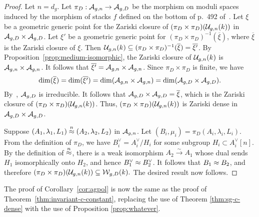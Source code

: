 \documentclass{amsart}
\begin{document}
\begin{proof}
Let $n = d_g$.
Let $\pi_D: \mathcal{A}_{g,n} \to \mathcal{A}_{g,{D}}$ be the morphism on moduli spaces induced by the morphism of stacks $f$ defined on the bottom of p.~492 of~\cite{dejong}.
Let $\xi$ be a geometric generic point for the Zariski closure of $(\pi_D \times \pi_D)(\mathcal{U}_{g,n}(k))$ in $\mathcal{A}_{g,{D}} \times \mathcal{A}_{g,{D}}$.
Let $\xi'$ be a geometric generic point for $(\pi_D\times\pi_D)^{-1}(\overline{\xi})$, where $\overline{\xi}$ is the
Zariski closure of $\xi$.
Then $\mathcal{U}_{g,n}(k) \subseteq (\pi_D\times\pi_D)^{-1}(\overline{\xi}) = \overline{\xi'}$.
By Proposition~\ref{prop:medium-isomorphic}, the Zariski closure of $\mathcal{U}_{g,n}(k)$ is $\mathcal{A}_{g,n} \times \mathcal{A}_{g,n}$.
It follows that $\overline{\xi'} = \mathcal{A}_{g,n} \times \mathcal{A}_{g,n}$.
Since $\pi_D\times\pi_D$ is finite, we have
$$\dim(\overline{\xi}) = \dim(\overline{\xi'}) = \dim(\mathcal{A}_{g,n} \times \mathcal{A}_{g,n}) = \dim(\mathcal{A}_{g,{D}} \times \mathcal{A}_{g,{D}}).
$$
By~\cite[Prop. 1.11]{dejong}, $\mathcal{A}_{g,{D}}$ is irreducible.
It follows that $\mathcal{A}_{g,{D}} \times \mathcal{A}_{g,{D}} = \overline{\xi}$, which is
 the Zariski closure of $(\pi_D \times \pi_D)(\mathcal{U}_{g,n}(k))$.
 Thus, $(\pi_D \times \pi_D)(\mathcal{U}_{g,n}(k))$ is Zariski dense in $\mathcal{A}_{g,{D}} \times \mathcal{A}_{g,{D}}$.

Suppose $(A_1, \lambda_1, L_1) \stackrel{n}{\approx} (A_2, \lambda_2, L_2)$ in $\mathcal{A}_{g,n}$. Let $(B_i, \mu_i) = \pi_D(A_i, \lambda_i, L_i)$. From the definition of $\pi_D$, we have $B_i^\vee = A_i^\vee/H_i$ for some subgroup $H_i \subset A^\vee_i[n]$. By the definition of $\stackrel{n}{\approx}$, there is a weak isomorphism $A_2 \xrightarrow{\sim} A_1$ whose dual sends $H_1$ isomorphically onto $H_2$, and hence %
  $B_1^\vee \approx B_2^\vee$. It follows that $B_1 \approx B_2$, and therefore
    $(\pi_D\times\pi_D)(\mathcal{U}_{g,n}(k)) \subseteq \mathcal{W}_{g,D}(k).$
The desired result now follows.
\end{proof}
The proof of Corollary~\ref{cor:agpol} is now the same as the proof of Theorem~\ref{thm:invariant-c-constant}, replacing the use of Theorem \ref{thm:sg-c-dense} with the use of Proposition \ref{prop:whatever}.



\end{document}
